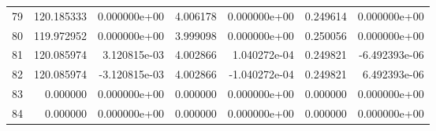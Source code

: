 \begin{tabular}{rrrrrrr}
79 & 120.185333 &  0.000000e+00 &  4.006178 &  0.000000e+00 &   0.249614 &  0.000000e+00 \\
80 & 119.972952 &  0.000000e+00 &  3.999098 &  0.000000e+00 &   0.250056 &  0.000000e+00 \\
81 & 120.085974 &  3.120815e-03 &  4.002866 &  1.040272e-04 &   0.249821 & -6.492393e-06 \\
82 & 120.085974 & -3.120815e-03 &  4.002866 & -1.040272e-04 &   0.249821 &  6.492393e-06 \\
83 &   0.000000 &  0.000000e+00 &  0.000000 &  0.000000e+00 &   0.000000 &  0.000000e+00 \\
84 &   0.000000 &  0.000000e+00 &  0.000000 &  0.000000e+00 &   0.000000 &  0.000000e+00 \\
\bottomrule
\end{tabular}
